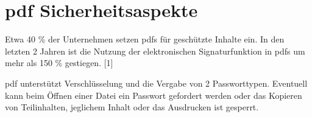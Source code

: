 \section{\gls{pdf} Sicherheitsaspekte}
Etwa 40 \% der Unternehmen setzen \gls{pdf}s für geschützte Inhalte ein. In den letzten 2 Jahren ist die Nutzung der elektronischen Signaturfunktion in \gls{pdf}s um mehr als 150 \% gestiegen. [1]
\par
\gls{pdf} unterstützt Verschlüsselung und die Vergabe von 2 Passworttypen. Eventuell kann beim Öffnen einer Datei ein Passwort gefordert werden oder das Kopieren von Teilinhalten, jeglichem Inhalt oder das Ausdrucken ist gesperrt.